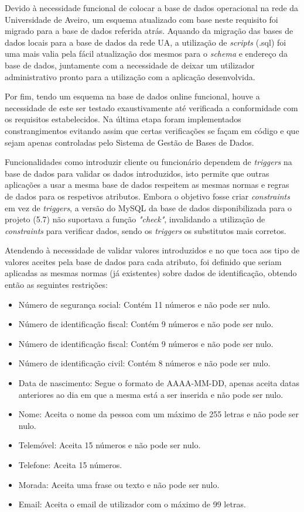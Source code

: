 \documentclass[11pt,a4paper,twoside]{report}
\begin{document}
Devido à necessidade funcional de colocar a base de dados operacional na rede da Universidade de Aveiro, um esquema atualizado com base neste requisito foi migrado para a base de dados referida atrás.
Aquando da migração das bases de dados locais para a base de dados da rede UA, a utilização de \textit{scripts} (.sql) foi uma mais valia pela fácil atualização dos mesmos para o \textit{schema} e endereço da base de dados, juntamente com a necessidade de deixar um utilizador administrativo pronto para a utilização com a aplicação desenvolvida.

Por fim, tendo um esquema na base de dados online funcional, houve a necessidade de este ser testado exaustivamente até verificada a conformidade com os requisitos estabelecidos.
Na última etapa foram implementados constrangimentos evitando assim que certas verificações se façam em código e que sejam apenas controladas pelo Sistema de Gestão de Bases de Dados.

Funcionalidades como introduzir cliente ou funcionário dependem de \textit{triggers} na base de dados para validar os dados introduzidos, isto permite que outras aplicações a usar a mesma base de dados respeitem as mesmas normas e regras de dados para os respetivos atributos. Embora o objetivo fosse criar \textit{constraints} em vez de \textit{triggers}, a versão do MySQL da base de dados disponibilizada para o projeto (5.7) não suportava a função \textit{"check"}, invalidando a utilização de \textit{constraints} para verificar dados, sendo os \textit{triggers} os substitutos mais corretos.

Atendendo à necessidade de validar valores introduzidos e no que toca aos tipo de valores aceites pela base de dados para cada atributo, foi definido que seriam aplicadas as mesmas normas (já existentes) sobre dados de identificação, obtendo então as seguintes restrições:

\begin{itemize}
	\item Número de segurança social: Contém 11 números e não pode ser nulo.
	\item Número de identificação fiscal: Contém 9 números e não pode ser nulo.
	\item Número de identificação fiscal: Contém 9 números e não pode ser nulo.
	\item Número de identificação civil: Contém 8 números e não pode ser nulo.
	\item Data de nascimento: Segue o formato de AAAA-MM-DD, apenas aceita datas anteriores ao dia em que a mesma está a ser inserida e não pode ser nulo.
	\item Nome: Aceita o nome da pessoa com um máximo de 255 letras e não pode ser nulo.
	\item Telemóvel: Aceita 15 números e não pode ser nulo.
	\item Telefone: Aceita 15 números.
	\item Morada: Aceita uma frase ou texto e não pode ser nulo.
	\item Email: Aceita o email de utilizador com o máximo de 99 letras.
\end{itemize}
\end{document}
